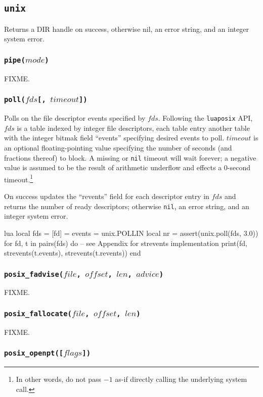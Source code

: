 \documentclass[11pt, oneside]{memoir}
\newcommand*{\luaposix}[0]{\texttt{luaposix}\xspace}
\newcommand*{\nil}[0]{\texttt{nil}\xspace}
\newcommand*{\fn}[1]{\texttt{#1}\xspace}
\newcommand*{\otherwise}[1]{otherwise #1, an error string, and an integer system error}
\newcounter{toccols}
\newenvironment{Module}[1]{
	\subsection{\texttt{#1}}
	\addtocontents{toc}{
		\protect\begin{multicols}{\value{toccols}}
	}
}{
	\addtocontents{toc}{\protect\end{multicols}}
}
\begin{document}
\begin{Module}{unix}
Returns a DIR handle on success, otherwise nil, an error string, and an integer system error.

\subsubsection[\fn{pipe}]{\fn{pipe($mode$)}}

FIXME.

\subsubsection[\fn{poll}]{\fn{poll($fds$[, $timeout$])}}

Polls on the file descriptor events specified by $fds$. Following the \luaposix API, $fds$ is a table indexed by integer file descriptors, each table entry another table with the integer bitmak field ``events'' specifying desired events to poll. $timeout$ is an optional floating-pointing value specifying the number of seconds (and fractions thereof) to block. A missing or \nil timeout will wait forever; a negative value is assumed to be the result of arithmetic underflow and effects a 0-second timeout.\footnote{In other words, do not pass $-1$ as-if directly calling the underlying system call.}

On success updates the ``revents'' field for each descriptor entry in $fds$ and returns the number of ready descriptors; \otherwise{\nil}.

\begin{example}{lua}
local fds = { [fd] = { events = unix.POLLIN } }
local nr = assert(unix.poll(fds, 3.0))
for fd, t in pairs(fds) do
  -- see Appendix for strevents implementation
  print(fd, strevents(t.events), strevents(t.revents))
end
\end{example}

\subsubsection[\fn{posix\_fadvise}]{\fn{posix\_fadvise($file$, $offset$, $len$, $advice$)}}

FIXME.

\subsubsection[\fn{posix\_fallocate}]{\fn{posix\_fallocate($file$, $offset$, $len$)}}

FIXME.

\subsubsection[\fn{posix\_openpt}]{\fn{posix\_openpt([$flags$])}}


\end{Module}
\end{document}
